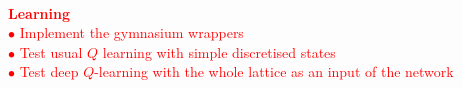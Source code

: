 \documentclass[aps,prl,twocolumn,amsmath,amssymb,superscriptaddress]{revtex4-1}
\newcommand{\obs}[1]{\textcolor{red}{#1}}
\begin{document}
\

\noindent\obs{\textbf{Learning}}\\
\obs{$\bullet$ Implement the gymnasium wrappers}\\
\obs{$\bullet$ Test usual $Q$ learning with simple discretised states}\\
\obs{$\bullet$ Test deep $Q$-learning with the whole lattice as an input of the network}

\

\begin{acknowledgments}
\end{acknowledgments}


\end{document}
